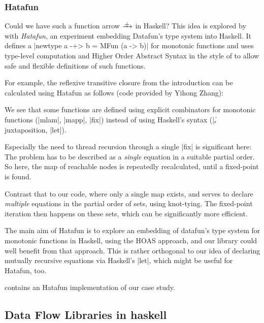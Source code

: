 \documentclass[manuscript,screen,acmsmall,nonacm]{acmart}
\begin{document}
\subsubsection{Hatafun}\label{sec:hatafun}

Could we have such a function arrow $\mfun$ in Haskell? This idea is explored by \citet{hatafun} with \emph{Hatafun}, an experiment embedding Datafun's type system into Haskell. It defines a |newtype a -+> b = MFun (a -> b)| for monotonic functions and uses type-level computation and Higher Order Abstract Syntax in the style of \citet{polakow} to allow safe and flexible definitions of such functions.

For example, the reflexive transitive closure from the introduction can be calculated using Hatafun as follows (code provided by Yihong Zhang):


We see that some functions are defined using explicit combinators for monotonic functions (|mlam|, |mapp|, |fix|) instead of using Haskell's syntax (|\|, juxtaposition, |let|).

Especially the need to thread recursion through a single |fix| is significant here: The problem has to be described as a \emph{single} equation in a suitable partial order. So here, the map of reachable nodes is repeatedly recalculated, until a fixed-point is found.

Contrast that to our code, where only a single map exists, and serves to declare \emph{multiple} equations in the partial order of sets, using knot-tying. The fixed-point iteration then happens on these sets, which can be significantly more efficient.

The main aim of Hatafun is to explore an embedding of datafun's type system for monotonic functions in Haskell, using the HOAS approach, and our library could well benefit from that approach. This is rather orthogonal to our idea of declaring mutually recursive equations via Haskell's |let|, which might be useful for Hatafun, too.

 contains an Hatafun implementation of our case study.

\subsection{Data Flow Libraries in haskell}\label{sec:datafix}
\end{document}
